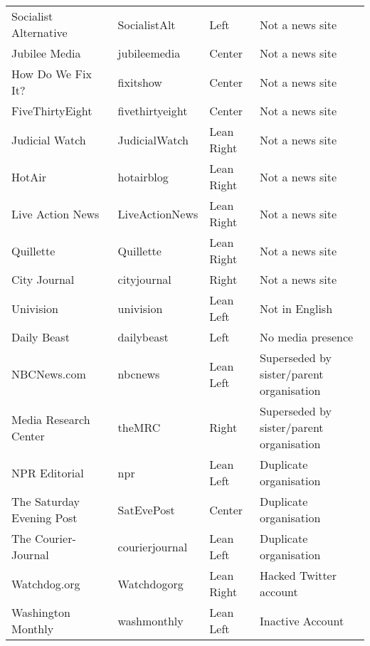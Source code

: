 \begin{tabular}{llll}
       Socialist Alternative &     SocialistAlt &          Left &                           Not a news site \\
               Jubilee Media &     jubileemedia &        Center &                           Not a news site \\
           How Do We Fix It? &        fixitshow &        Center &                           Not a news site \\
             FiveThirtyEight &  fivethirtyeight &        Center &                           Not a news site \\
              Judicial Watch &    JudicialWatch &    Lean Right &                           Not a news site \\
                      HotAir &       hotairblog &    Lean Right &                           Not a news site \\
            Live Action News &   LiveActionNews &    Lean Right &                           Not a news site \\
                   Quillette &        Quillette &    Lean Right &                           Not a news site \\
                City Journal &      cityjournal &         Right &                           Not a news site \\
                   Univision &        univision &     Lean Left &                            Not in English \\
                 Daily Beast &       dailybeast &          Left &                         No media presence \\
                 NBCNews.com &          nbcnews &     Lean Left &  Superseded by sister/parent organisation \\
       Media Research Center &           theMRC &         Right &  Superseded by sister/parent organisation \\
               NPR Editorial &              npr &     Lean Left &                    Duplicate organisation \\
   The Saturday Evening Post &       SatEvePost &        Center &                    Duplicate organisation \\
         The Courier-Journal &   courierjournal &     Lean Left &                    Duplicate organisation \\
                Watchdog.org &      Watchdogorg &    Lean Right &                    Hacked Twitter account \\
          Washington Monthly &      washmonthly &     Lean Left &                          Inactive Account \\

\end{tabular}
